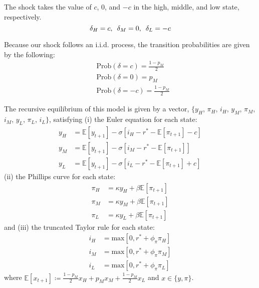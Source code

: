 \documentclass[11pt]{article}
\begin{document}
	The shock takes the value of $c$, $0$, and $-c$ in the high, middle, and low state, respectively.
	\begin{equation}
	\delta_H = c, \hspace{0.5em}\delta_M = 0, \hspace{0.5em}\delta_L = -c
	\end{equation}
	
	Because our shock follows an i.i.d. process, the transition probabilities are given by the following: 
	\begin{align}
	& \text{Prob}\left(\delta = c \right) = \frac{1-p_M}{2}\\
	& \text{Prob}\left(\delta = 0 \right) = p_M\\
	& \text{Prob}\left(\delta = -c \right) = \frac{1-p_M}{2}
	\end{align}
	\noindent
	
	The recursive equilibrium of this model is given by a vector, $\{y_H$, $\pi_H$, $i_H$, $y_M$, $\pi_M$, $i_M$, $y_L$, $\pi_L$, $i_L\}$, satisfying (i) the Euler equation for each state: 
	\begin{align}
	y_{H} & = \mathbb{E}[y_{t+1}] - \sigma\left[i_{H} - r^* - \mathbb{E}[\pi_{t+1}]-c\right] \label{eq:EE_H} \\
	y_{M} & = \mathbb{E}[y_{t+1}] - \sigma\left[i_{M} - r^* - \mathbb{E}[\pi_{t+1} ]\right] \label{eq:EE_M}\\
	y_{L} & = \mathbb{E}[y_{t+1}] - \sigma\left[i_{L} - r^* - \mathbb{E}[\pi_{t+1}] +c\right] \label{eq:EE_L}
	\end{align}
	\noindent (ii) the Phillips curve for each state: 
	\begin{align}
	\pi_{H}  & = \kappa y_{H} + \beta\mathbb{E}[\pi_{t+1}]  \label{eq:PC_H}\\
	\pi_{M}  & = \kappa y_{M} + \beta\mathbb{E}[\pi_{t+1}]  \label{eq:PC_M}\\
	\pi_{L}  & = \kappa y_{L} + \beta\mathbb{E}[\pi_{t+1}]  \label{eq:PC_L}
	\end{align}
	\noindent and (iii) the truncated Taylor rule for each state: 
	\begin{align}
	i_{H} & = \text{max}\left[0, r^*  + \phi_{\pi}\pi_{H} \right] \label{eq:TR_H}\\
	i_{M} & = \text{max}\left[0, r^*  + \phi_{\pi}\pi_{M} \right] \label{eq:TR_M}\\
	i_{L} & = \text{max}\left[0, r^*  + \phi_{\pi}\pi_{L} \right] \label{eq:TR_L}
	\end{align}
	where $\mathbb{E}[x_{t+1}] \coloneqq \frac{1-p_M}{2}x_H + p_Mx_M + \frac{1-p_M}{2}x_L$ and $x\in\{y,\pi\}$.
	
\end{document}
